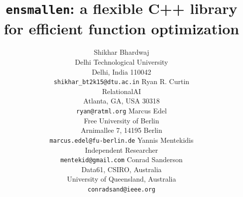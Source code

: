 \documentclass{article}
\begin{document}
\title{\texttt{ensmallen}: a flexible C++ library for efficient function optimization}

\author{Shikhar Bhardwaj \\
Delhi Technological University \\
Delhi, India 110042 \\
\texttt{shikhar\_bt2k15@dtu.ac.in}
\And
Ryan R. Curtin \\
RelationalAI \\
Atlanta, GA, USA 30318 \\
\texttt{ryan@ratml.org}
\And
Marcus Edel \\
Free University of Berlin \\
Arnimallee 7, 14195 Berlin \\
\texttt{marcus.edel@fu-berlin.de}
\And
Yannis Mentekidis \\
Independent Researcher \\
\texttt{mentekid@gmail.com}
\And
Conrad Sanderson \\
Data61, CSIRO, Australia \\
University of Queensland, Australia\\
\texttt{conradsand@ieee.org}
}

\maketitle
\end{document}
